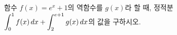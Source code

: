 함수 $f(x)=e^x+1$의 역함수를 $g(x)$라 할 때, 정적분 $\displaystyle\int_{0}^{1} f(x)\mkern3mu dx+\int_{2}^{e+1} g(x)\mkern3mu dx$의 값을 구하시오.
